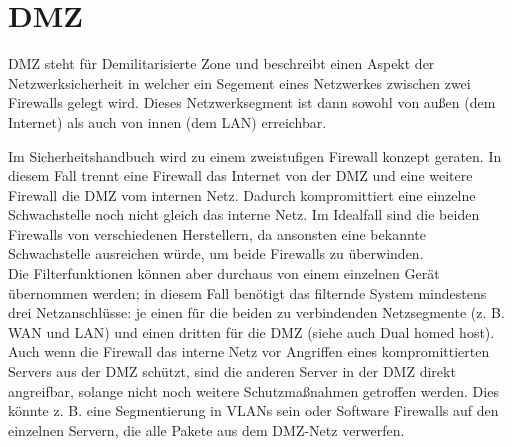 \section{DMZ}
DMZ steht für Demilitarisierte Zone und beschreibt einen Aspekt der Netzwerksicherheit in welcher ein Segement eines Netzwerkes zwischen zwei Firewalls gelegt wird. Dieses Netzwerksegment ist dann sowohl von außen (dem Internet) als auch von innen (dem LAN) erreichbar. 

Im Sicherheitshandbuch wird zu einem zweistufigen Firewall konzept geraten. In diesem Fall trennt eine Firewall das Internet von der DMZ und eine weitere Firewall die DMZ vom internen Netz. Dadurch kompromittiert eine einzelne Schwachstelle noch nicht gleich das interne Netz. Im Idealfall sind die beiden Firewalls von verschiedenen Herstellern, da ansonsten eine bekannte Schwachstelle ausreichen würde, um beide Firewalls zu überwinden.\\

Die Filterfunktionen können aber durchaus von einem einzelnen Gerät übernommen werden; in diesem Fall benötigt das filternde System mindestens drei Netzanschlüsse: je einen für die beiden zu verbindenden Netzsegmente (z. B. WAN und LAN) und einen dritten für die DMZ (siehe auch Dual homed host).\\

Auch wenn die Firewall das interne Netz vor Angriffen eines kompromittierten Servers aus der DMZ schützt, sind die anderen Server in der DMZ direkt angreifbar, solange nicht noch weitere Schutzmaßnahmen getroffen werden. Dies könnte z. B. eine Segmentierung in VLANs sein oder Software Firewalls auf den einzelnen Servern, die alle Pakete aus dem DMZ-Netz verwerfen.
